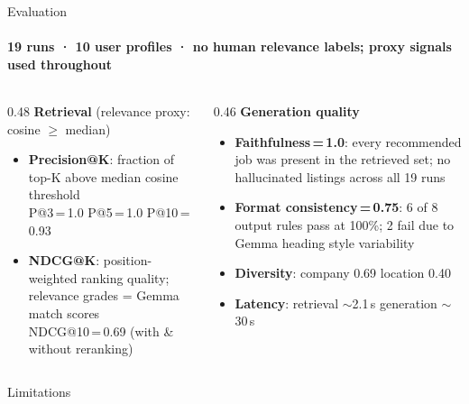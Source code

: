 \documentclass[aspectratio=169]{beamer}
\begin{document}
\begin{frame}{Evaluation}
  \framesubtitle{19 runs · 10 user profiles · no human relevance labels; proxy signals used throughout}
  \vspace{4pt}
  \begin{columns}[t]
    \begin{column}{0.48\textwidth}
      \textbf{\color{accent}Retrieval} \textnormal{\small(relevance proxy: cosine $\geq$ median)}\\[6pt]
      \begin{itemize}\small\setlength{\itemsep}{6pt}
        \item \textbf{Precision@K}: fraction of top-K above median cosine threshold\\
          {\footnotesize P@3\,=\,1.0 \enspace P@5\,=\,1.0 \enspace P@10\,=\,0.93}
        \item \textbf{NDCG@K}: position-weighted ranking quality; relevance grades = Gemma match scores\\
          {\footnotesize NDCG@10\,=\,0.69 (with \& without reranking)}
      \end{itemize}
    \end{column}
    \begin{column}{0.46\textwidth}
      \textbf{\color{accent}Generation quality}\\[6pt]
      \begin{itemize}\small\setlength{\itemsep}{6pt}
        \item \textbf{Faithfulness\,=\,1.0}: every recommended job was present in the retrieved set; no hallucinated listings across all 19 runs
        \item \textbf{Format consistency\,=\,0.75}: 6 of 8 output rules pass at 100\%; 2 fail due to Gemma heading style variability
        \item \textbf{Diversity}: company 0.69 \enspace location 0.40
        \item \textbf{Latency}: retrieval $\sim$2.1\,s \enspace generation $\sim$30\,s
      \end{itemize}
    \end{column}
  \end{columns}
\end{frame}

\begin{frame}{Limitations}
  \vfill
  \centering
  \vfill
\end{frame}
\end{document}
